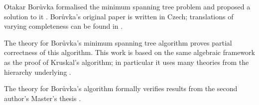 \documentclass[11pt,a4paper]{article}
\begin{document}
Otakar Bor\r{u}vka formalised the minimum spanning tree problem and proposed a solution to it \cite{Boruvka1926}.
Bor\r{u}vka's original paper is written in Czech; translations of varying completeness can be found in \cite{GrahamHell1985,NesetrilMilkovaNesetrilova2001}.

The theory for Bor\r{u}vka's minimum spanning tree algorithm proves partial correctness of this algorithm.
This work is based on the same algebraic framework as the proof of Kruskal's algorithm; in particular it uses many theories from the hierarchy underlying \cite{Guttmann2018a}.

The theory for Bor\r{u}vka's algorithm formally verifies results from the second author's Master's thesis \cite{RobinsonOBrien2020}.

\begin{flushleft}

\end{flushleft}



\end{document}
